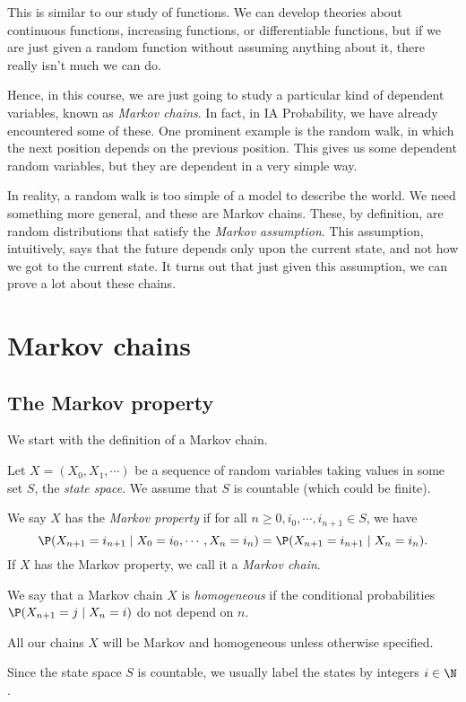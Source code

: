 \documentclass[a4paper]{article}
\begin{document}
This is similar to our study of functions. We can develop theories about continuous functions, increasing functions, or differentiable functions, but if we are just given a random function without assuming anything about it, there really isn't much we can do.

Hence, in this course, we are just going to study a particular kind of dependent variables, known as \emph{Markov chains}. In fact, in IA Probability, we have already encountered some of these. One prominent example is the random walk, in which the next position depends on the previous position. This gives us some dependent random variables, but they are dependent in a very simple way.

In reality, a random walk is too simple of a model to describe the world. We need something more general, and these are Markov chains. These, by definition, are random distributions that satisfy the \emph{Markov assumption}. This assumption, intuitively, says that the future depends only upon the current state, and not how we got to the current state. It turns out that just given this assumption, we can prove a lot about these chains.

\section{Markov chains}
\subsection{The Markov property}
We start with the definition of a Markov chain.
\begin{defi}
  Let $X = (X_0, X_1, \cdots)$ be a sequence of random variables taking values in some set $S$, the \emph{state space}. We assume that $S$ is countable (which could be finite).

  We say $X$ has the \emph{Markov property} if for all $n\geq 0, i_0,\cdots, i_{n + 1}\in S$, we have
  \[
    \P(X_{n + 1} = i_{n + 1} \mid X_0 = i_0, \cdots, X_n = i_n) = \P(X_{n + 1} = i_{n + 1} \mid X_n = i_n).
  \]
  If $X$ has the Markov property, we call it a \emph{Markov chain}.

  We say that a Markov chain $X$ is \emph{homogeneous} if the conditional probabilities $\P(X_{n + 1} = j \mid X_n = i)$ do not depend on $n$.
\end{defi}
All our chains $X$ will be Markov and homogeneous unless otherwise specified.

Since the state space $S$ is countable, we usually label the states by integers $i \in \N$.
\end{document}
